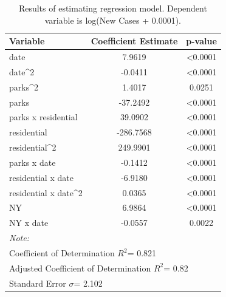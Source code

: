 \documentclass[]{elsarticle} %
\begin{document}
\begin{table}[!h]

\caption{\label{tab:model-results}\label{tab:model-results}Results of estimating regression model. Dependent variable is log(New Cases + 0.0001).}
\centering
\begin{tabular}[t]{lcc}
\toprule
Variable & Coefficient Estimate & p-value\\
\midrule
\rowcolor{gray!6}  date & 7.9619 & <0.0001\\
date\textasciicircum{}2 & -0.0411 & <0.0001\\
\rowcolor{gray!6}  parks\textasciicircum{}2 & 1.4017 & 0.0251\\
parks & -37.2492 & <0.0001\\
\rowcolor{gray!6}  parks x residential & 39.0902 & <0.0001\\
\addlinespace
residential & -286.7568 & <0.0001\\
\rowcolor{gray!6}  residential\textasciicircum{}2 & 249.9901 & <0.0001\\
parks x date & -0.1412 & <0.0001\\
\rowcolor{gray!6}  residential x date & -6.9180 & <0.0001\\
residential x date\textasciicircum{}2 & 0.0365 & <0.0001\\
\addlinespace
\rowcolor{gray!6}  NY & 6.9864 & <0.0001\\
NY x date & -0.0557 & 0.0022\\
\bottomrule
\multicolumn{3}{l}{\textit{Note: }}\\
\multicolumn{3}{l}{Coefficient of Determination $R^2$= 0.821}\\
\multicolumn{3}{l}{Adjusted Coefficient of Determination $R^2$= 0.82}\\
\multicolumn{3}{l}{Standard Error $\sigma$= 2.102}\\
\end{tabular}
\end{table}
\end{document}
